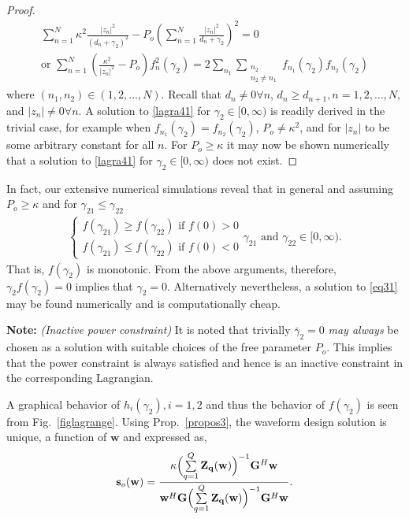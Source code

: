 \documentclass[11pt,draftclsnofoot,onecolumn]{IEEEtran}
\theoremstyle{definition}
\theoremstyle{remark}
\begin{document}
\begin{proof}
\begin{equation}\label{lagra41}
\begin{aligned}
\sum\limits_{n=1}^N  \kappa^2\frac{|z_n|^2}{(d_n+\gamma_2)^2} -P_o\left( \sum\limits_{n=1}^N \frac{|z_n|^2}{d_n+\gamma_2}\right)^2=0 \\
\mbox{or } \sum\limits_{n=1}^N (\frac{\kappa^2}{|z_n|^2}-P_o )f_n^2(\gamma_2)=2\sum\limits_{n_1}\sum\limits_{\substack{n_2\\ n_2\neq n_1}} f_{n_1}(\gamma_2)f_{n_2}(\gamma_2)
\end{aligned}
\end{equation}
where $(n_1,n_2)\in (1,2,\ldots,N)$. Recall that $d_n\neq 0 \forall n$, $d_n\geq d_{n+1}, n=1,2,\ldots, N$, and $ |z_n|\neq 0 \forall n$.  A solution to \eqref{lagra41} for $\gamma_2 \in[0,\infty)$ is readily derived in the trivial  case, for example when $f_{n_1}(\gamma_2)=f_{n_2}(\gamma_2)$, $P_o\neq \kappa^2$, and for $|z_n|$ to be some arbitrary constant for all $n$. For $P_o\geq \kappa$ it may now be shown numerically that a solution to \eqref{lagra41} for $\gamma_2 \in [0,\infty)$ does not exist.
\end{proof}
In fact, our extensive numerical simulations reveal that in general and assuming $P_o\geq \kappa$ and for $\gamma_{21}\leq \gamma_{22}$
\begin{align} \label{lagra51}
\begin{cases}
f(\gamma_{21})\geq f(\gamma_{22}) \mbox{ if } f(0)>0 \\
f(\gamma_{21})\leq f(\gamma_{22}) \mbox{ if } f(0)<0 
\end{cases} \gamma_{21} \mbox{ and } \gamma_{22} \in[0,\infty).
\end{align}
That is, $f(\gamma_2)$ is monotonic. From the above arguments, therefore, $\gamma_2f(\gamma_2)=0$ implies that  $\gamma_2=0$. Alternatively nevertheless, a solution to \eqref{eq31} may be found numerically and is computationally cheap. 

{\bf Note:} {\it (Inactive power constraint)} It is noted that trivially $\bar{\gamma}_2=0$ {\it may always} be chosen as a solution with suitable choices of the free parameter $P_o$. This implies that the power constraint is always satisfied and hence is an inactive constraint in the corresponding Lagrangian.


A graphical behavior of $h_i(\gamma_2),i=1,2$ and thus the behavior of $f(\gamma_2)$ is seen from Fig.~\ref{figlagrange}. Using Prop.~\ref{propos3}, the waveform design solution is  unique, a function of $\mathbf{w}$ and expressed as,
\begin{align} \label{eq32}
\mathbf{s}_o(\mathbf{w})=\frac{\kappa \Bigl( \sum\limits_{q=1}^Q \mathbf{Z_q}( \mathbf{w})\Bigr)^{-1}\mathbf{G}^H\mathbf{w} }{\mathbf{w}^H\mathbf{G} \Bigl( \sum\limits_{q=1}^Q \mathbf{Z_q}( \mathbf{w})\Bigr)^{-1}\mathbf{G}^H\mathbf{w}}.
\end{align}
\end{document}
